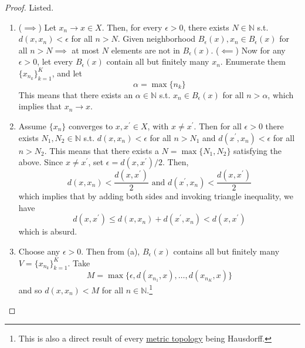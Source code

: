   \begin{proof}
    Listed. 
    \begin{enumerate}
      \item ($\implies$) Let $x_n \rightarrow x \in X$. Then, for every $\epsilon > 0$, there exists $N \in \mathbb{N}$ s.t. $d(x, x_n) < \epsilon$ for all $n > N$. Given neighborhood $B_\epsilon (x), x_n \in B_\epsilon (x)$ for all $n > N \implies$ at most $N$ elements are not in $B_\epsilon (x)$. ($\impliedby$) Now for any $\epsilon > 0$, let every $B_\epsilon (x)$ contain all but finitely many $x_n$. Enumerate them $\{x_{n_k}\}_{k=1}^K$, and let 
      \begin{equation}
        \alpha = \max \{n_k\}
      \end{equation}
      This means that there exists an $\alpha \in \mathbb{N}$ s.t. $x_n \in B_\epsilon (x)$ for all $n > \alpha$, which implies that $x_n \rightarrow x$. 

      \item Assume $\{x_n\}$ converges to $x, x^\prime \in X$, with $x \neq x^\prime$. Then for all $\epsilon > 0$ there exists $N_1, N_2 \in \mathbb{N}$ s.t. $d(x, x_n) < \epsilon$ for all $n > N_1$ and $d(x^\prime, x_n) < \epsilon$ for all $n > N_2$. This means that there exists a $N = \max\{N_1, N_2\}$ satisfying the above. Since $x \neq x^\prime$, set $\epsilon = d(x, x^\prime) /2$. Then, 
      \begin{equation}
        d(x, x_n) < \frac{d(x, x^\prime)}{2} \text{ and } d(x^\prime, x_n) < \frac{d(x, x^\prime)}{2}
      \end{equation}
      which implies that by adding both sides and invoking triangle inequality, we have 
      \begin{equation}
        d(x, x^\prime) \leq d(x, x_n) + d(x^\prime, x_n) < d(x, x^\prime)
      \end{equation}
      which is absurd. 

      \item Choose any $\epsilon > 0$. Then from (a), $B_\epsilon (x)$ contains all but finitely many $V = \{x_{n_k}\}_{k=1}^K$. Take 
      \begin{equation}
        M = \max \{\epsilon, d(x_{n_1}, x), \ldots, d(x_{n_K}, x)\}
      \end{equation}
      and so $d(x, x_n) < M$ for all $n \in \mathbb{N}$.\footnote{This is also a direct result of every \hyperref[def:metric-topology]{metric topology} being Hausdorff.}


\end{enumerate}
\end{proof}
